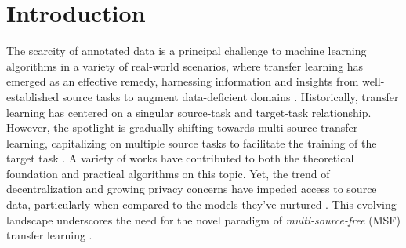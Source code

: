 \documentclass[letterpaper]{article} %
\begin{document}
\section{Introduction}

The scarcity of annotated data is a principal challenge to machine learning algorithms in a variety of real-world scenarios, where transfer learning has emerged as an effective remedy, harnessing information and insights from well-established source tasks to augment data-deficient domains \citep[see][]{perkins1992transfer, weiss2016survey, zhuang2020comprehensive}. Historically, transfer learning has centered on a singular source-task and target-task relationship. However, the spotlight is gradually shifting towards multi-source transfer learning, capitalizing on multiple source tasks to facilitate the training of the target task \citep[see][]{sun2015survey}. A variety of works have contributed to both the theoretical foundation and practical algorithms on this topic. 
Yet, the trend of decentralization and growing privacy concerns have impeded access to source data, particularly when compared to the models they've nurtured \citep{feng2021kd3a}. This evolving landscape underscores the need for the novel paradigm of \textit{multi-source-free} (MSF) transfer learning \citep{fang2022source}.




\end{document}

